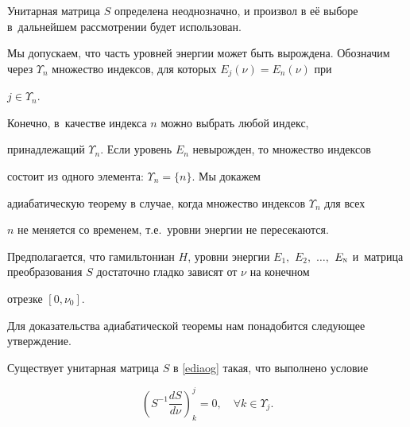 Унитарная матрица $S$ определена неоднозначно, и произвол в её выборе в~дальнейшем рассмотрении будет использован.



Мы допускаем, что часть уровней энергии может быть вырождена. Обозначим через $\Upsilon_n$ множество индексов, для которых $E_j(\nu)=E_n(\nu)$ при

$j\in\Upsilon_n$. 

Конечно, в~качестве индекса $n$ можно выбрать любой индекс,

принадлежащий $\Upsilon_n$. Если уровень $E_n$ невырожден, то множество индексов

состоит из одного элемента: $\Upsilon_n=\lbrace n\rbrace$. Мы докажем

адиабатическую теорему в случае, когда множество индексов $\Upsilon_n$ для всех

$n$ не меняется со временем, т.е.\ уровни энергии не пересекаются.



Предполагается, что гамильтониан $H$, уровни энергии $E_1,$ $E_2,$ $\dotsc,$ $E_{\textsc{n}}$ и~матрица преобразования $S$ достаточно гладко зависят от $\nu$ на конечном

отрезке $[0,\nu_0]$.



Для доказательства адиабатической теоремы нам понадобится следующее утверждение.



\begin{lemma}Существует унитарная матрица $S$ в \eqref{ediaog} такая{\rm,} что выполнено условие

\begin{equation}                                                  \label{eadcom}

  \left(S^{-1}\frac{dS}{d\nu}\right)_k^j=0, \quad  \forall k\in\Upsilon_j.

\end{equation}

\end{lemma}



